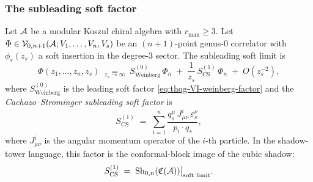 \subsubsection{The subleading soft factor}

\begin{theorem}
\label{thm:thqg-VI-subleading-soft}
Let $\mathcal{A}$ be a modular Koszul chiral algebra with $r_{\max} \geq 3$.
Let $\Phi \in \mathcal{V}_{0,n+1}(\mathcal{A}; V_1, \dotsc, V_n, V_s)$ be an
$(n+1)$-point genus-$0$ correlator with $\phi_s(z_s)$ a soft
insertion in the degree-$3$ sector. The subleading soft limit is
\begin{equation}\label{eq:thqg-VI-subleading}
\Phi(z_1, \dotsc, z_n, z_s)
\;\underset{z_s \to \infty}{=}\;
S^{(0)}_{\mathrm{Weinberg}}\,\Phi_n
\;+\;
\frac{1}{z_s}\,S^{(1)}_{\mathrm{CS}}\,\Phi_n
\;+\; O(z_s^{-2}),
\end{equation}
where $S^{(0)}_{\mathrm{Weinberg}}$ is the leading soft factor
\eqref{eq:thqg-VI-weinberg-factor} and the
\emph{Cachazo--Strominger subleading soft factor} is
\begin{equation}\label{eq:thqg-VI-cs-factor}
S^{(1)}_{\mathrm{CS}}
\;=\;
\sum_{i=1}^{n}
\frac{q_s^\mu\,J^i_{\mu\nu}\,\varepsilon_s^\nu}{p_i \cdot q_s},
\end{equation}
where $J^i_{\mu\nu}$ is the angular momentum operator of the
$i$-th particle. In the shadow-tower language, this factor is
the conformal-block image of the cubic shadow:
\begin{equation}\label{eq:thqg-VI-cs-from-cubic}
S^{(1)}_{\mathrm{CS}}
\;=\;
\operatorname{Sh}_{0,n}(\mathfrak{C}(\mathcal{A}))\bigl|_{\text{soft limit}}.
\end{equation}
\end{theorem}

